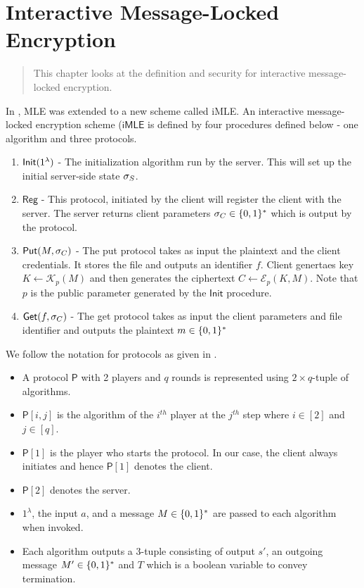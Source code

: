 \chapter{Interactive Message-Locked Encryption}
\label{chap:imle}

\begin{quote} \small
	This chapter looks at the definition and security for interactive message-locked encryption.
\end{quote}

In \cite{imle}, MLE was extended to a new scheme called iMLE. An interactive message-locked encryption scheme ($\mathsf{iMLE}$ is defined by four procedures defined below - one algorithm and three protocols.
\begin{enumerate}
	\item $\mathsf{Init}(1^{\lambda})$ - The initialization algorithm run by the server. This will set up the initial server-side state $\sigma_S$.
	
	\item $\mathsf{Reg}$ - This protocol, initiated by the client will register the client with the server. The server returns client parameters $\sigma_C \in \{0,1\}^*$ which is output by the protocol.
	
	\item $\mathsf{Put}(M, \sigma_C)$ - The put protocol takes as input the plaintext and the client credentials. It stores the file and outputs an identifier $f$. Client genertaes key $K \leftarrow \mathcal{K}_{p}(M)$ and then generates the ciphertext $C \leftarrow \mathcal{E}_{p}(K, M)$. Note that $p$ is the public parameter generated by the $\mathsf{Init}$ procedure.
	
	\item $\mathsf{Get}(f, \sigma_C)$ - The get protocol takes as input the client parameters and file identifier and outputs the plaintext $m \in \{0,1\}^*$
\end{enumerate}

We follow the notation for protocols as given in \cite{imle}.
\begin{itemize}
	\item A protocol $\mathsf{P}$ with 2 players and $q$ rounds is represented using $2 \times q$-tuple of algorithms.
	\item $\mathsf{P}[i,j]$ is the algorithm of the $i^{th}$ player at the $j^{th}$ step where $i \in [2]$ and $j \in [q]$.
	\item $\mathsf{P}[1]$ is the player who starts the protocol. In our case, the client always initiates and hence $\mathsf{P}[1]$ denotes the client.
	\item $\mathsf{P}[2]$ denotes the server.
	\item $1^\lambda$, the input $a$, and a message $M \in \{0,1\}^*$ are passed to each algorithm when invoked.
	\item Each algorithm outputs a 3-tuple consisting of output $s'$, an outgoing message $M' \in \{0,1\}^*$ and $T$ which is a boolean variable to convey termination.
\end{itemize}

